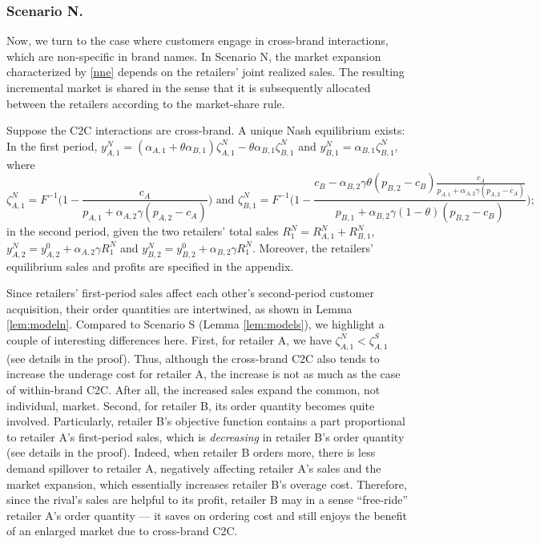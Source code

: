 \documentclass[nonblindrev,copyedit]{informs1}
\begin{document}
\subsubsection{Scenario N.}
Now, we turn to the case where customers engage in cross-brand interactions, which are non-specific in brand names. In Scenario N, the market expansion characterized by \eqref{nne} depends on the retailers’ joint realized sales. The resulting incremental market is shared in the sense that it is subsequently allocated between the retailers according to the market-share rule.
\begin{lemma}
\label{lem:modeln}
Suppose the C2C interactions are cross-brand. A unique Nash equilibrium exists: In the first period, $y^{N}_{A,1} = (\alpha_{A,1} + \theta \alpha_{B,1}) \zeta_{A,1}^N - \theta \alpha_{B,1} \zeta_{B,1}^N$ and $y^{N}_{B,1} = \alpha_{B,1} \zeta_{B,1}^N$, where
\[
\zeta^N_{A,1} = F^{-1} \bigg( 1- \frac{c_A}{p_{A,1} + \alpha_{A,2} \gamma (p_{A,2} -c_A)} \bigg)\text{ and }
        \zeta^N_{B,1}= F^{-1} \bigg( 1- \frac{c_B - \alpha_{B,2} \gamma \theta (p_{B,2} -c_B)  \frac{c_A}{p_{A,1} + \alpha_{A,2} \gamma (p_{A,2}-c_A)}}{p_{B,1} + \alpha_{B,2} \gamma (1-\theta)(p_{B,2} -c_B)} \bigg);
\]
in the second period, given the two retailers' total sales $R_1^N=R_{A,1}^N+R_{B,1}^N$, $y^{N}_{A,2} = y_{A,2}^0 + \alpha_{A,2} \gamma R_{1}^N$ and $y^{N}_{B,2} = y_{B,2}^0 + \alpha_{B,2} \gamma R_{1}^N$. Moreover, the retailers' equilibrium sales and profits are specified in the appendix.
\end{lemma}

Since retailers' first-period sales affect each other's second-period customer acquisition, their order quantities are intertwined, as shown in Lemma \ref{lem:modeln}. Compared to Scenario S (Lemma \ref{lem:models}), we highlight a couple of interesting differences here. First, for retailer A, we have $\zeta_{A,1}^N <\zeta_{A,1}^S$ (see details in the proof). Thus, although the cross-brand C2C also tends to increase the underage cost for retailer A, the increase is not as much as the case of within-brand C2C. After all, the increased sales expand the common, not individual, market.
Second, for retailer B, its order quantity becomes quite involved. Particularly, retailer B's objective function contains a part proportional to retailer A's first-period sales, which is \textit{decreasing} in retailer B's order quantity (see details in the proof). Indeed, when retailer B orders more, there is less demand spillover to retailer A, negatively affecting retailer A's sales and the market expansion, which essentially increases retailer B's overage cost. Therefore, since the rival's sales are helpful to its profit, retailer B may in a sense ``free-ride'' retailer A's order quantity --- it saves on ordering cost and still enjoys the benefit of an enlarged market due to cross-brand C2C.
\end{document}
